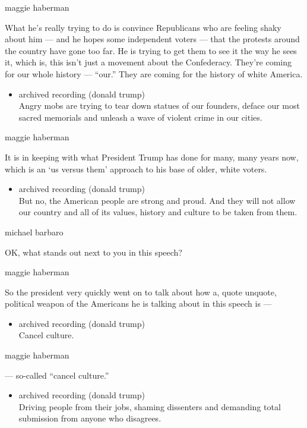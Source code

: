 maggie haberman

What he's really trying to do is convince Republicans who are feeling
shaky about him --- and he hopes some independent voters --- that the
protests around the country have gone too far. He is trying to get them
to see it the way he sees it, which is, this isn't just a movement about
the Confederacy. They're coming for our whole history --- ``our.'' They
are coming for the history of white America.

\begin{itemize}
\tightlist
\item
  archived recording (donald trump)\\
  Angry mobs are trying to tear down statues of our founders, deface our
  most sacred memorials and unleash a wave of violent crime in our
  cities.
\end{itemize}

maggie haberman

It is in keeping with what President Trump has done for many, many years
now, which is an `us versus them' approach to his base of older, white
voters.

\begin{itemize}
\tightlist
\item
  archived recording (donald trump)\\
  But no, the American people are strong and proud. And they will not
  allow our country and all of its values, history and culture to be
  taken from them.
\end{itemize}

michael barbaro

OK, what stands out next to you in this speech?

maggie haberman

So the president very quickly went on to talk about how a, quote
unquote, political weapon of the Americans he is talking about in this
speech is ---

\begin{itemize}
\tightlist
\item
  archived recording (donald trump)\\
  Cancel culture.
\end{itemize}

maggie haberman

--- so-called ``cancel culture.''

\begin{itemize}
\tightlist
\item
  archived recording (donald trump)\\
  Driving people from their jobs, shaming dissenters and demanding total
  submission from anyone who disagrees.
\end{itemize}

